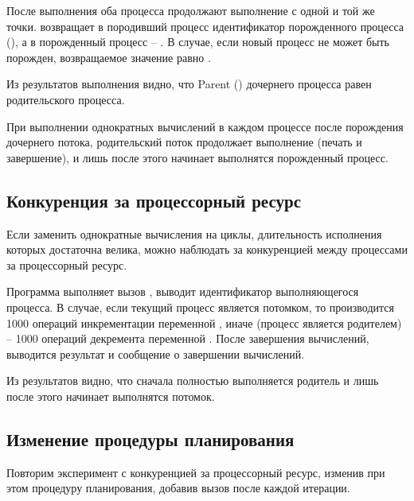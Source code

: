 После выполнения  оба процесса продолжают выполнение с одной и той же точки.  возвращает в породивший процесс идентификатор порожденного
процесса (), а в порожденный процесс -- . В случае, если новый процесс не может быть порожден, возвращаемое значение равно .



Из результатов выполнения видно, что Parent  () дочернего процесса равен  родительского процесса.

При выполнении однократных вычислений в каждом процессе после порождения дочернего потока, родительский поток продолжает выполнение (печать и завершение), и лишь после этого начинает выполнятся порожденный процесс.

\subsection{Конкуренция за процессорный ресурс}

Если заменить однократные вычисления на циклы, длительность исполнения которых достаточна велика, можно наблюдать за конкуренцией между процессами за процессорный ресурс. 



Программа выполняет вызов , выводит идентификатор выполняющегося процесса. В случае, если текущий процесс является потомком, то производится 1000 операций инкрементации переменной , иначе (процесс является родителем) -- 1000 операций декремента переменной . После завершения вычислений, выводится результат и сообщение о завершении вычислений.



Из результатов видно, что сначала полностью выполняется родитель и лишь после этого начинает выполнятся потомок.

\newpage

\subsection{Изменение процедуры планирования}

Повторим эксперимент с конкуренцией за процессорный ресурс, изменив при этом процедуру планирования, добавив вызов  после каждой итерации.



